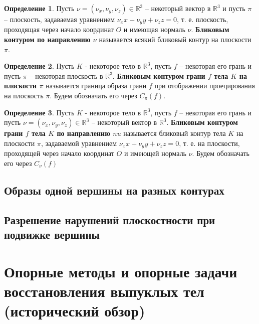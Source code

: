 \documentclass[a4paper, 12pt, titlepage]{article}
\theoremstyle{definition}
\newtheorem{SmartDefinition}{Определение}
\theoremstyle{plain}
\theoremstyle{plain}
\begin{document}
\begin{SmartDefinition}
 Пусть $\nu = (\nu_{x}, \nu_{y}, \nu_{z}) \in \mathbb{R}^{3}$ -- некоторый
 вектор в $\mathbb{R}^{3}$ и пусть $\pi$ -- плоскость, задаваемая уравнением
 $\nu_{x} x + \nu_{y} y + \nu_{z} z = 0$, т. е. плоскость, проходящая через
 начало координат $O$ и имеющая нормаль $\nu$. \textbf{Бликовым контуром по
 направлению $\nu$} называется всякий бликовый контур на плоскости $\pi$.
\end{SmartDefinition}

\begin{SmartDefinition}
 Пусть $K$ - некоторое тело в $\mathbb{R}^{3}$, пусть $f$ -- некоторая его
 грань и пусть $\pi$ -- некоторая плоскость в $\mathbb{R}^{3}$.
 \textbf{Бликовым контуром грани $f$ тела $K$ на плоскости $\pi$} называется
 граница образа грани $f$ при отображении проецирования на плоскость $\pi$.
 Будем обозначать его через $C_{\pi}(f)$.
\end{SmartDefinition}

\begin{SmartDefinition}
 Пусть $K$ - некоторое тело в $\mathbb{R}^{3}$, пусть $f$ -- некоторая его
 грань и пусть $\nu = (\nu_{x}, \nu_{y}, \nu_{z}) \in \mathbb{R}^{3}$ --
 некоторый вектор в $\mathbb{R}^{3}$.
 \textbf{Бликовым контуром грани $f$ тела $K$ по направлению  $nu$} называется
 бликовый контур тела $K$ на плоскости $\pi$, задаваемой уравнением
 $\nu_{x} x + \nu_{y} y + \nu_{z} z = 0$, т. е. на плоскости, проходящей через
 начало координат $O$ и имеющей нормаль $\nu$. Будем обозначать его через
 $C_{\nu}(f)$
\end{SmartDefinition}


\subsection{Образы одной вершины на разных контурах}

\subsection{Разрешение нарушений плоскостности при подвижке вершины}


\section{Опорные методы и опорные задачи восстановления выпуклых
тел (исторический обзор)}
\end{document}
